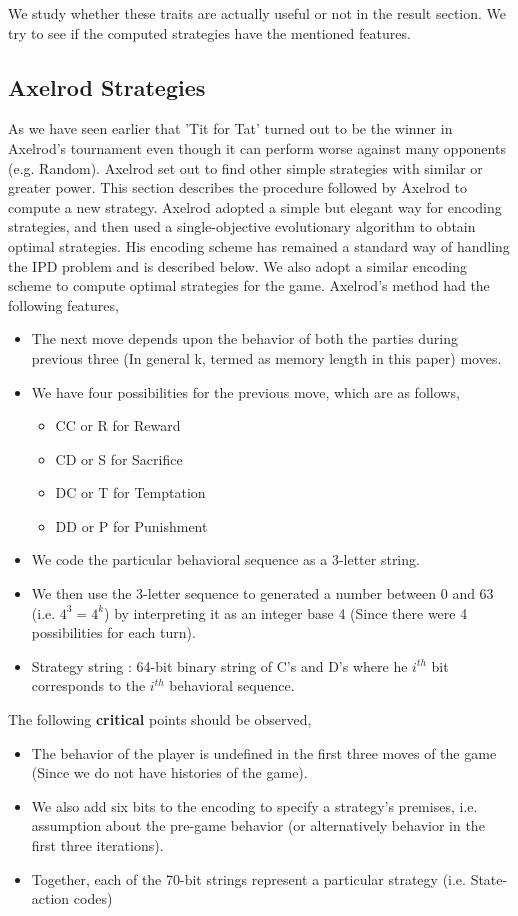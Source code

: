 \documentclass[a4paper]{article}
\begin{document}
	We study whether these traits are actually useful or not in the result section. We try to see  if the computed strategies have the mentioned features.
	
	\subsection{Axelrod Strategies}	

As we have seen earlier that 'Tit for Tat' turned out to be the winner in Axelrod's tournament even though it can perform worse against many opponents (e.g. Random). Axelrod set out to find other simple strategies with similar or greater power. This section describes the procedure followed by Axelrod to compute a new strategy.
Axelrod adopted a simple but elegant way for encoding strategies, and then used a single-objective evolutionary algorithm to obtain optimal strategies. His encoding scheme has remained a standard way of handling the IPD problem and is described below. We also adopt a similar encoding scheme to compute optimal strategies for the game. Axelrod's method had the following features,
	\begin{itemize}
	\item The next move depends upon the behavior of both the parties during previous three (In general k, termed as memory length in this paper) moves.
	\item We have four possibilities for the previous move, which are as follows,
	\begin{itemize}
		\item CC or R for Reward
		\item CD or S for Sacrifice
		\item DC or T for Temptation
		\item DD or P for Punishment
	\end{itemize}		
	\item We code the particular behavioral sequence as a 3-letter string.	
	\item We then use the 3-letter sequence to generated a number between 0 and 63 (i.e. $4^{3} = 4^{k}$) by interpreting it as an integer base 4 (Since there were 4 possibilities for each turn).
	\item Strategy string : 64-bit binary string of C's and D's where he $i^{th}$ bit corresponds to the $i^{th}$ behavioral sequence.
	\end{itemize}

	The following \textbf{critical} points should be observed,
	\begin{itemize}
	\item The behavior of the player is undefined in the first three moves of the game (Since we do not have histories of the game).
	\item We also add six bits to the encoding to specify a strategy's premises, i.e. assumption about the pre-game behavior (or alternatively behavior in the first three iterations).
	\item Together, each of the 70-bit strings represent a particular strategy (i.e. State-action codes)	
	\end{itemize}		
	
\end{document}

